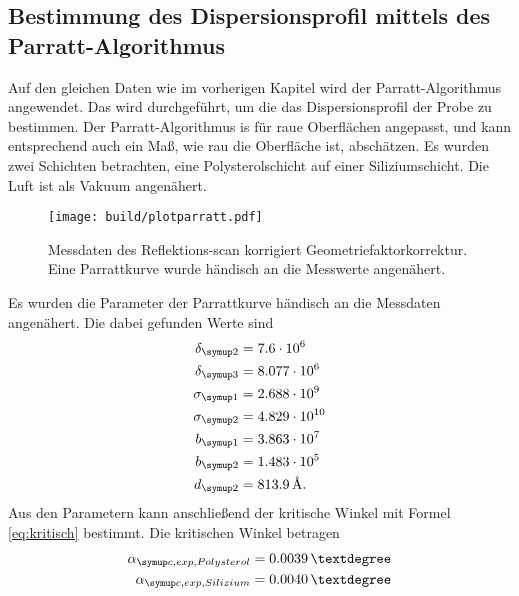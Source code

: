 \subsection{Bestimmung des Dispersionsprofil mittels des Parratt-Algorithmus}
Auf den gleichen Daten wie im vorherigen Kapitel wird der Parratt-Algorithmus angewendet. Das wird durchgeführt, um die das Dispersionsprofil
der Probe zu bestimmen. Der Parratt-Algorithmus is für raue Oberflächen angepasst, und kann entsprechend auch ein Maß, wie rau die Oberfläche
ist, abschätzen. Es wurden zwei Schichten betrachten, eine Polysterolschicht auf einer Siliziumschicht. Die Luft ist als Vakuum angenähert.
\begin{figure}
    \centering
    \texttt{[image: build/plotparratt.pdf]}
    \caption{Messdaten des Reflektions-scan korrigiert Geometriefaktorkorrektur. Eine Parrattkurve wurde händisch an die Messwerte angenähert.}
    \label{fig:refl}
\end{figure}
Es wurden die Parameter der Parrattkurve händisch an die Messdaten angenähert. Die dabei gefunden Werte sind
\begin{equation}
    \begin{aligned}
        \delta\idx{2} &= 7.6\cdot 10^{6} \\
        \delta\idx{3} &= 8.077\cdot 10^{6} \\
        \sigma\idx{1} &= 2.688\cdot 10^{9} \\
        \sigma\idx{2} &= 4.829\cdot 10^{10} \\
        b\idx{1} &= 3.863\cdot 10^{7} \\
        b\idx{2} &= 1.483\cdot 10^{5} \\
        d\idx{2} &=  813.9\,\si{\angstrom}.
    \end{aligned}
\end{equation}
Aus den Parametern kann anschließend der kritische Winkel mit Formel \eqref{eq:kritisch} bestimmt. Die kritischen Winkel betragen
\begin{equation}
    \begin{aligned}
        \alpha\idx{c, exp, Polysterol} &= 0.0039\,° \\
        \alpha\idx{c, exp, Silizium} &= 0.0040\,°
    \end{aligned}
\end{equation}